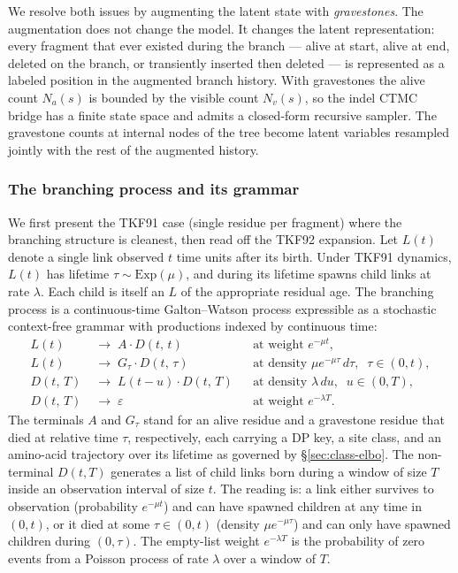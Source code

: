 We resolve both issues by augmenting the latent state with
\emph{gravestones}. The augmentation does not change the model. It
changes the latent representation: every fragment that ever existed
during the branch --- alive at start, alive at end, deleted on the
branch, or transiently inserted then deleted --- is represented as
a labeled position in the augmented branch history. With gravestones
the alive count $N_a(s)$ is bounded by the visible count $N_v(s)$,
so the indel CTMC bridge has a finite state space and admits a
closed-form recursive sampler. The gravestone counts at internal
nodes of the tree become latent variables resampled jointly with the
rest of the augmented history.

\subsubsection*{The branching process and its grammar}

We first present the TKF91 case (single residue per fragment) where
the branching structure is cleanest, then read off the TKF92
expansion. Let $L(t)$ denote a single link observed $t$ time units
after its birth. Under TKF91 dynamics, $L(t)$ has lifetime
$\tau \sim \mathrm{Exp}(\mu)$, and during its lifetime spawns child
links at rate $\lambda$. Each child is itself an $L$ of the
appropriate residual age. The branching process is a
continuous-time Galton--Watson process expressible as a stochastic
context-free grammar with productions indexed by continuous time:
\begin{align*}
L(t) &\;\to\; A \cdot D(t,\, t)
& &\text{at weight } e^{-\mu t}, \\
L(t) &\;\to\; G_\tau \cdot D(t,\, \tau)
& &\text{at density } \mu e^{-\mu \tau}\, d\tau, \;\; \tau \in (0, t), \\
D(t,\, T) &\;\to\; L(t - u) \cdot D(t,\, T)
& &\text{at density } \lambda \, du, \;\; u \in (0, T), \\
D(t,\, T) &\;\to\; \varepsilon
& &\text{at weight } e^{-\lambda T}.
\end{align*}
The terminals $A$ and $G_\tau$ stand for an alive residue and a
gravestone residue that died at relative time $\tau$, respectively,
each carrying a DP key, a site class, and an amino-acid trajectory
over its lifetime as governed by \S\ref{sec:class-elbo}. The
non-terminal $D(t, T)$ generates a list of child links born during
a window of size $T$ inside an observation interval of size $t$.
The reading is: a link either survives to observation (probability
$e^{-\mu t}$) and can have spawned children at any time in
$(0, t)$, or it died at some $\tau \in (0, t)$ (density
$\mu e^{-\mu \tau}$) and can only have spawned children during
$(0, \tau)$. The empty-list weight $e^{-\lambda T}$ is the
probability of zero events from a Poisson process of rate $\lambda$
over a window of $T$.

